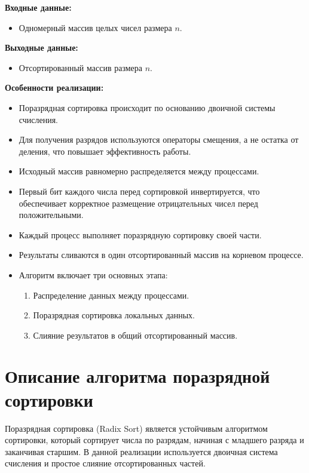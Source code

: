 \documentclass[12pt]{article}
\begin{document}
\textbf{Входные данные:}
\begin{itemize}
\item Одномерный массив целых чисел размера $n$.
\end{itemize}

\textbf{Выходные данные:}
\begin{itemize}
\item Отсортированный массив размера $n$.
\end{itemize}

\textbf{Особенности реализации:}
\begin{itemize}
\item Поразрядная сортировка происходит по основанию двоичной системы счисления.
\item Для получения разрядов используются операторы смещения, а не остатка от деления, что повышает эффективность работы.
\item Исходный массив равномерно распределяется между процессами.
\item Первый бит каждого числа перед сортировкой инвертируется, что обеспечивает корректное размещение отрицательных чисел перед положительными.
\item Каждый процесс выполняет поразрядную сортировку своей части.
\item Результаты сливаются в один отсортированный массив на корневом процессе.
\item Алгоритм включает три основных этапа:
  \begin{enumerate}
    \item Распределение данных между процессами.
    \item Поразрядная сортировка локальных данных.
    \item Слияние результатов в общий отсортированный массив.
  \end{enumerate}
\end{itemize}


\section{Описание алгоритма поразрядной сортировки}

Поразрядная сортировка (Radix Sort) является устойчивым алгоритмом сортировки, который сортирует числа по разрядам, начиная с младшего разряда и заканчивая старшим. В данной реализации используется двоичная система счисления и простое слияние отсортированных частей.
\end{document}
